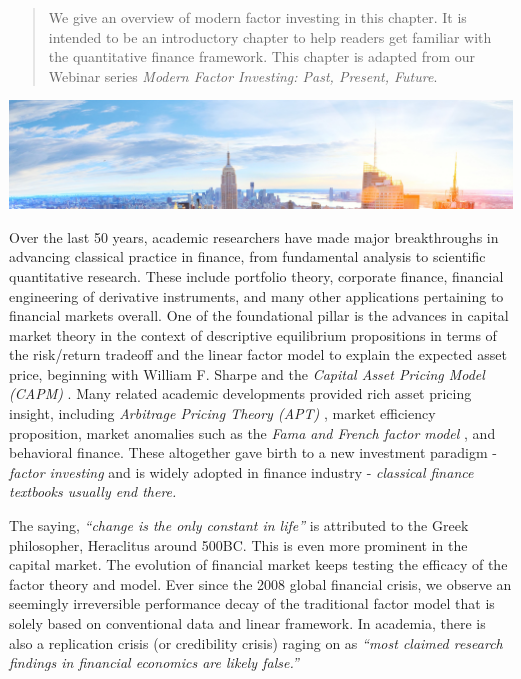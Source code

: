 \documentclass[
]{book}
\begin{document}
\begin{quote}
We give an overview of modern factor investing in this chapter. It is intended to be an introductory chapter to help readers get familiar with the quantitative finance framework. This chapter is adapted from our Webinar series {\emph{Modern Factor Investing: Past, Present, Future}}.
\end{quote}

\includegraphics[width=1\linewidth]{images/chapter3/nyc}

Over the last 50 years, academic researchers have made major breakthroughs in advancing classical practice in finance, from fundamental analysis to scientific quantitative research. These include portfolio theory, corporate finance, financial engineering of derivative instruments, and many other applications pertaining to financial markets overall. One of the foundational pillar is the advances in capital market theory in the context of descriptive equilibrium propositions in terms of the risk/return tradeoff and the linear factor model to explain the expected asset price, beginning with William F. Sharpe and the {\emph{Capital Asset Pricing Model (CAPM)}} \citep{sharpe1964capital}. Many related academic developments provided rich asset pricing insight, including {\emph{Arbitrage Pricing Theory (APT)}} \citep{ross1976arbitrage}, market efficiency proposition, market anomalies such as the {\emph{Fama and French factor model}} \citep{fama1993common}, and behavioral finance. These altogether gave birth to a new investment paradigm - {\emph{factor investing}} and is widely adopted in finance industry - \emph{classical finance textbooks usually end there.}

The saying, \emph{``change is the only constant in life''} is attributed to the Greek philosopher, Heraclitus around 500BC. This is even more prominent in the capital market. The evolution of financial market keeps testing the efficacy of the factor theory and model. Ever since the 2008 global financial crisis, we observe an seemingly irreversible performance decay of the traditional factor model that is solely based on conventional data and linear framework. In academia, there is also a replication crisis (or credibility crisis) raging on as \emph{``most claimed research findings in financial economics are likely false.''} \citep{harvey2016and}
\end{document}
